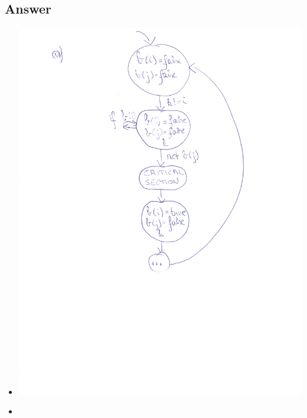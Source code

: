 \documentclass[12pt]{article}
\begin{document}
\subsection*{Answer}
\begin{itemize}
	\item \begin{centering}
		\includegraphics*[scale=0.6]{210a.jpg}
	\end{centering}
	\item \begin{centering}

\end{centering}
\end{itemize}
\end{document}
